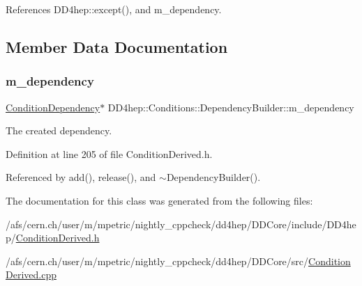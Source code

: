 References D\+D4hep\+::except(), and m\+\_\+dependency.



\subsection{Member Data Documentation}
\hypertarget{class_d_d4hep_1_1_conditions_1_1_dependency_builder_a038744f80e334eb539859fbc60614836}{}\label{class_d_d4hep_1_1_conditions_1_1_dependency_builder_a038744f80e334eb539859fbc60614836} 
\subsubsection{\texorpdfstring{m\+\_\+dependency}{m\_dependency}}
{\footnotesize\ttfamily \hyperlink{class_d_d4hep_1_1_conditions_1_1_condition_dependency}{Condition\+Dependency}$\ast$ D\+D4hep\+::\+Conditions\+::\+Dependency\+Builder\+::m\+\_\+dependency\hspace{0.3cm}{\ttfamily [protected]}}



The created dependency. 



Definition at line 205 of file Condition\+Derived.\+h.



Referenced by add(), release(), and $\sim$\+Dependency\+Builder().



The documentation for this class was generated from the following files\+:\begin{DoxyCompactItemize}
\item 
/afs/cern.\+ch/user/m/mpetric/nightly\+\_\+cppcheck/dd4hep/\+D\+D\+Core/include/\+D\+D4hep/\hyperlink{_condition_derived_8h}{Condition\+Derived.\+h}\item 
/afs/cern.\+ch/user/m/mpetric/nightly\+\_\+cppcheck/dd4hep/\+D\+D\+Core/src/\hyperlink{_condition_derived_8cpp}{Condition\+Derived.\+cpp}\end{DoxyCompactItemize}
